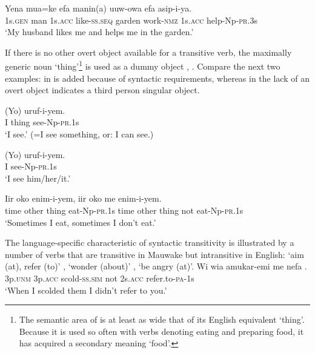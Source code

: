 \ea%
\label{ex:3:x299}
\gll Yena mua=ke efa  manin(a) uuw-owa efa asip-i-ya.\\
1s.\textsc{gen} man 1s.\textsc{acc} like-\textsc{ss}.\textsc{seq} garden work-\textsc{nmz} 1s.\textsc{acc} help-Np-\textsc{pr}.3s\\
\glt`My husband likes me and helps me in the garden.'
\z

If there is no other overt object available for a transitive verb, the maximally generic noun  `thing'\footnote{The semantic area of  is at least as wide that of its English equivalent `thing'. Because it is used so often with verbs denoting eating and preparing food, it has acquired a secondary meaning `food'.} is used as a dummy object , . Compare the next two examples: in   is added because of syntactic requirements, whereas in  the lack of an overt object indicates a third person singular object.

\ea%
\label{ex:3:x300}
\gll (Yo)  uruf-i-yem. \\
I thing see-Np-\textsc{pr}.1s \\
\glt`I see.' (=I see something, or: I can see.) 
\z

\ea%
\label{ex:3:x301}
\gll (Yo) uruf-i-yem. \\
I see-Np-\textsc{pr}.1s \\
\glt`I see him/her/it.'
\z

\ea%
\label{ex:3:x1825}
\gll Iir oko  enim-i-yem, iir oko  me enim-i-yem. \\
time other thing eat-Np-\textsc{pr}.1s time other thing not eat-Np-\textsc{pr}.1s\\
\glt`Sometimes I eat, sometimes I don't eat.'
\z

The language-specific characteristic of syntactic transitivity \citep[49--51]{Kittila2002} is illustrated by a number of verbs that are transitive in Mauwake but intransitive in English:  `aim (at), refer (to)' ,  `wonder (about)' ,  `be angry (at)'.
%
%
\ea%
\label{ex:3:x302}
\gll Wi wia amukar-emi me nefa . \\
3p.\textsc{unm} 3p.\textsc{acc} scold-\textsc{ss}.\textsc{sim} not 2s.\textsc{acc} refer.to-\textsc{pa}-1s \\
\glt`When I scolded them I didn't refer to you.'
\z

